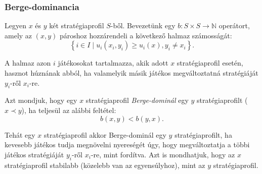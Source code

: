 \begin{table}[t]
  \centering
  \caption{Példa egy fogolydilemma típusú játékra.}\label{tab:BERGE_EGYENSULY}
\end{table}


\subsubsection{Berge-dominancia}
Legyen $x$ és $y$ két stratégiaprofil $S$-ből.
Bevezetünk egy $b \colon S \times S \to \mathbb{N}$ operátort, amely az $\left( x, y \right)$ pároshoz hozzárendeli a következő halmaz számosságát:
\[
  \left\{ i \in I \mid u_i(x_i, y_i) \ge u_i(x), y_i \neq x_i \right\}.
\]

A halmaz azon $i$ játékosokat tartalmazza, akik adott $x$ stratégiaprofil esetén, hasznot húznának abból, ha valamelyik másik játékos megváltoztatná stratégiáját $y_i$-ről $x_i$-re.

\begin{ert}
  Azt mondjuk, hogy egy $x$ stratégiaprofil \emph{Berge-dominál} egy $y$ stratégiaprofilt ($x \prec y$), ha teljesül az alábbi feltétel:
  \begin{equation}\label{eqn:BERGE_DOMINANCIA}
    b(x,y) < b(y, x).
  \end{equation}
\end{ert}

Tehát egy $x$ stratégiaprofil akkor Berge-dominál egy $y$ stratégiaprofilt, ha kevesebb játékos tudja megnövelni nyereségét úgy, hogy megváltoztatja a többi játékos stratégiáját $y_i$-ről $x_i$-re, mint fordítva.
Azt is mondhatjuk, hogy az $x$ stratégiaprofil stabilabb (közelebb van az egyensúlyhoz), mint az $y$ stratégiaprofil.


